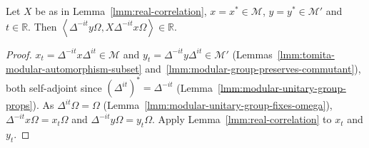 \begin{lemma}
    \label{lmm:modular-rotated-correlation-real}
    \leanok
    Let $X$ be as in Lemma~\ref{lmm:real-correlation}, $x = x^* \in \mathcal{M}$, $y = y^* \in \mathcal{M}'$ and $t \in \mathbb{R}$. Then $\left< \Delta^{-it}y\Omega, X\Delta^{-it}x\Omega \right> \in \mathbb{R}$.
\end{lemma}
\begin{proof}
    \leanok
    $x_t = \Delta^{-it}x\Delta^{it} \in \mathcal{M}$ and $y_t = \Delta^{-it}y\Delta^{it} \in \mathcal{M}'$ (Lemmas~\ref{lmm:tomita-modular-automorphism-subset} and~\ref{lmm:modular-group-preserves-commutant}), both self-adjoint since $(\Delta^{it})^* = \Delta^{-it}$ (Lemma~\ref{lmm:modular-unitary-group-props}). As $\Delta^{it}\Omega = \Omega$ (Lemma~\ref{lmm:modular-unitary-group-fixes-omega}), $\Delta^{-it}x\Omega = x_t\Omega$ and $\Delta^{-it}y\Omega = y_t\Omega$. Apply Lemma~\ref{lmm:real-correlation} to $x_t$ and $y_t$.
\end{proof}

